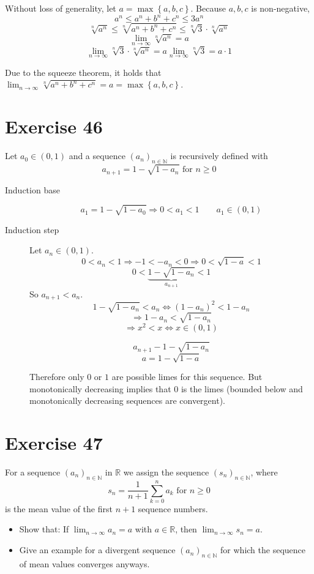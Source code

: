 \documentclass[a4paper]{article}
\theoremstyle{definition}
\newcommand\set[1]{\left\{#1\right\}}
\begin{document}
Without loss of generality, let $a = \max\set{a,b,c}$. Because $a,b,c$ is non-negative,
\[ a^n \leq a^n + b^n + c^n \leq 3a^n \]
\[ \sqrt[n]{a^n} \leq \sqrt[n]{a^n + b^n + c^n} \leq \sqrt[n]{3} \cdot \sqrt[n]{a^n} \]
\[ \lim_{n\to\infty} \sqrt[n]{a^n} = a \]
\[ \lim_{n\to\infty} \sqrt[n]{3} \cdot \sqrt[n]{a^n} = a \lim_{n\to\infty} \sqrt[n]{3} = a \cdot 1 \]

Due to the squeeze theorem, it holds that $\lim_{n\to\infty} \sqrt[n]{a^n + b^n + c^n} = a = \max\set{a,b,c}$.

\section{Exercise 46}
\begin{ex}
  Let $a_0 \in (0, 1)$ and a sequence $(a_n)_{n\in\mathbb N}$ is recursively defined with
  \[ a_{n+1} = 1 - \sqrt{1 - a_n} \text{ for } n \geq 0 \]
\end{ex}

\begin{description}
  \item[Induction base]
    \[ a_1 = 1 - \sqrt{1 - a_0} \Rightarrow 0 < a_1 < 1 \qquad a_1 \in (0, 1) \]
  \item[Induction step]
    Let $a_n \in (0, 1)$.
    \[ 0 < a_n < 1 \Rightarrow -1 < -a_n < 0 \Rightarrow 0 < \sqrt{1 - a} < 1 \]
    \[ 0 < \underbrace{1 - \sqrt{1 - a_n}}_{a_{n+1}} < 1 \]
    So $a_{n+1} < a_n$.
    \[ 1 - \sqrt{1 - a_n} < a_n \Leftrightarrow (1 - a_n)^2 < 1 - a_n \]
    \[ \Rightarrow 1 - a_n < \sqrt{1 - a_n} \]
    \[ \Rightarrow x^2 < x \Leftrightarrow x \in (0, 1) \]

    \[ a_{n+1} - 1 - \sqrt{1 - a_n} \]
    \[ a = 1 - \sqrt{1 - a} \]

    Therefore only $0$ or $1$ are possible limes for this sequence.
    But monotonically decreasing implies that $0$ is the limes
    (bounded below and monotonically decreasing sequences are convergent).
\end{description}

\section{Exercise 47}
\begin{ex}
  For a sequence $\left(a_n\right)_{n\in\mathbb N}$ in $\mathbb R$ we assign the sequence $\left(s_n\right)_{n\in\mathbb N}$, where
  \[ s_n = \frac{1}{n+1} \sum_{k=0}^n a_k \text{ for } n \geq 0 \]
  is the mean value of the first $n+1$ sequence numbers.
  \begin{itemize}
    \item Show that: If $\lim_{n\to\infty} a_n = a$ with $a \in \mathbb R$, then $\lim_{n\to\infty} s_n = a$.
    \item Give an example for a divergent sequence $\left(a_n\right)_{n \in \mathbb N}$ for which the sequence of mean values converges anyways.
  \end{itemize}
\end{ex}
\end{document}
